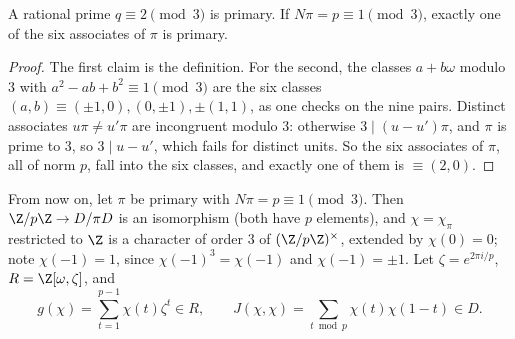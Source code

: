 \begin{lemma}\label{lem:primary}
A rational prime $q\equiv2\pmod3$ is primary. If $N\pi=p\equiv1\pmod3$, exactly one of the six associates of $\pi$ is primary.
\end{lemma}
\begin{proof}
The first claim is the definition. For the second, the classes $a+b\omega$ modulo $3$ with $a^2-ab+b^2\equiv1\pmod3$ are the six classes
$(a,b)\equiv(\pm1,0),(0,\pm1),\pm(1,1)$, as one checks on the nine pairs. Distinct associates $u\pi\ne u'\pi$ are incongruent modulo $3$: otherwise $3\mid(u-u')\pi$,
and $\pi$ is prime to $3$, so $3\mid u-u'$, which fails for distinct units. So the six associates of $\pi$, all of norm $p$, fall into the six classes, and
exactly one of them is $\equiv(2,0)$.
\end{proof}

From now on, let $\pi$ be primary with $N\pi=p\equiv1\pmod3$. Then $\Z/p\Z\to D/\pi D$ is an isomorphism (both have $p$ elements), and $\chi=\chi_\pi$
restricted to $\Z$ is a character of order $3$ of $(\Z/p\Z)^\times$, extended by $\chi(0)=0$; note $\chi(-1)=1$, since $\chi(-1)^3=\chi(-1)$ and
$\chi(-1)=\pm1$. Let $\zeta=e^{2\pi i/p}$, $R=\Z[\omega,\zeta]$, and
\[
g(\chi)=\sum_{t=1}^{p-1}\chi(t)\zeta^t\in R,\qquad J(\chi,\chi)=\sum_{t\bmod p}\chi(t)\chi(1-t)\in D.
\]

